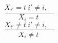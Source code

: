 $$\frac{X_{i'}=t~i' \neq i,~~~~}{X_{i}=t~}$$ $$\frac{X_{i'} \neq t~i' \neq i,~~~~}{X_{i} \neq t~}$$ 